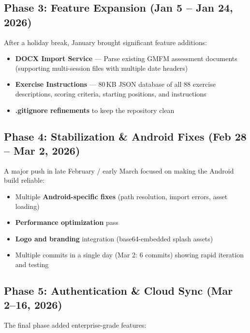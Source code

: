 \documentclass[12pt,a4paper]{article}
\begin{document}
\subsection{Phase 3: Feature Expansion (Jan 5 -- Jan 24, 2026)}

After a holiday break, January brought significant feature additions:

\begin{itemize}[leftmargin=2em]
    \item \textbf{DOCX Import Service} --- Parse existing GMFM assessment documents (supporting multi-session files with multiple date headers)
    \item \textbf{Exercise Instructions} --- 80\,KB JSON database of all 88 exercise descriptions, scoring criteria, starting positions, and instructions
    \item \textbf{.gitignore refinements} to keep the repository clean
\end{itemize}

\subsection{Phase 4: Stabilization \& Android Fixes (Feb 28 -- Mar 2, 2026)}

A major push in late February / early March focused on making the Android build reliable:

\begin{itemize}[leftmargin=2em]
    \item Multiple \textbf{Android-specific fixes} (path resolution, import errors, asset loading)
    \item \textbf{Performance optimization} pass
    \item \textbf{Logo and branding} integration (base64-embedded splash assets)
    \item Multiple commits in a single day (Mar 2: 6 commits) showing rapid iteration and testing
\end{itemize}

\subsection{Phase 5: Authentication \& Cloud Sync (Mar 2--16, 2026)}

The final phase added enterprise-grade features:
\end{document}
